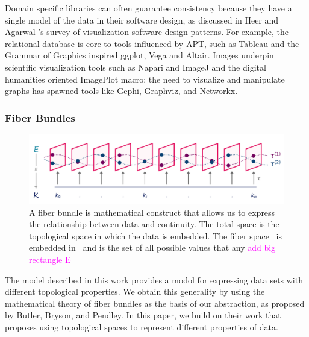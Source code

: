 \documentclass[10pt,journal,compsoc]{IEEEtran}
\newcommand{\note}[1]{\textcolor{magenta}{#1}}
\theoremstyle{definition}
\theoremstyle{remark}
\begin{document}
Domain specific libraries can often guarantee consistency because they have a single model of the data in their software design, as discussed in Heer and Agarwal \cite{HeerSoftware2006}'s survey of visualization software design patterns. For example, the relational database is core to tools influenced by APT, such as Tableau\cite{StoltePolaris2002,hanrahanVizQL2006,MackinlayShowme2007} and the Grammar of Graphics\cite{wilkinsonGrammarGraphics2005} inspired ggplot\cite{wickhamGgplot2ElegantGraphics2016a}, Vega\cite{satyanarayanDeclarativeInteractionDesign2014} and Altair\cite{vanderplasAltairInteractiveStatistical2018}. Images underpin scientific visualization tools such as Napari\cite{nicholas_sofroniew_2021_4533308} and ImageJ\cite{schneiderNIHImageImageJ2012} and the digital humanities oriented ImagePlot\cite{studiesCulturevisImageplot2021} macro; the need to visualize and manipulate graphs has spawned tools like Gephi\cite{bastianGephiOpenSource2009}, Graphviz\cite{ellsonGraphvizOpenSource2002}, and Networkx\cite{HagbergExploringNetwork2008}. 
 
\subsubsection{Fiber Bundles}
\label{sec:related-work:fiber-bundles}
\begin{figure}[h!]
  \includegraphics[width=\columnwidth]{fiberbundle.png}
  \caption{A fiber bundle is mathematical construct that allows us to express the relationship between data and continuity. The \textcolor{total}{total} space \dtotal is the topological space in which the data is embedded. The \textcolor{fiber}{fiber} space \dfiber\ is embedded in \dtotal\ and is the set of all possible values that any
  \note{add big rectangle E}}
  \label{fig:related-work:fiber-bundle}
\end{figure}

The model described in this work provides a modol for expressing data sets with different topological properties. 
We obtain this generality by using the mathematical theory of fiber bundles as the basis of our abstraction, as proposed by Butler, Bryson, and Pendley\cite{butlerVisualizationModelBased1989,butlerVectorBundleClassesForm1992}. In this paper, we build on their work that proposes using topological spaces to represent different properties of data.
\end{document}
